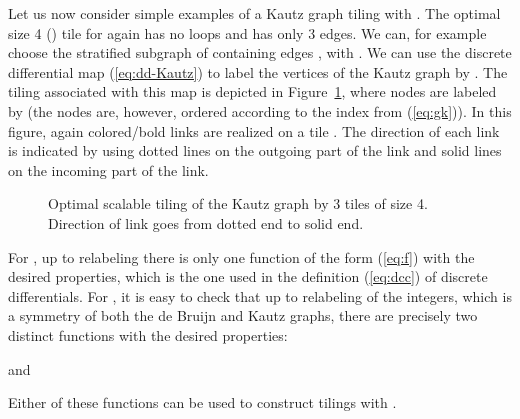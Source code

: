 \documentclass[12pt]{article}
\begin{document}
Let us now consider simple examples of a Kautz graph tiling with .  The optimal size 4 () tile for  again has no loops
and has only 3 edges.  We can, for example choose the stratified
subgraph of  containing edges , with .  We can use the discrete differential map
(\ref{eq:dd-Kautz}) 
to label the vertices of the Kautz graph  by .  The tiling associated with this map is depicted in
Figure~\ref{f:k23-4}, where nodes are labeled by  (the
nodes are, however, ordered according to the index  from
(\ref{eq:gk})).  In this figure, again colored/bold links are realized
on a tile .  The direction of each link is indicated by using
dotted lines on the outgoing part of the link and solid lines on the
incoming part of the link.
\begin{figure}
\begin{center}
\end{center}
\caption[x]{\footnotesize Optimal scalable tiling of the Kautz graph
   by 3 tiles of size 4.  Direction of link goes from
  dotted end to solid end.}
\label{f:k23-4}
\end{figure}

For , up to relabeling there is only one function of the form
(\ref{eq:f}) with the desired properties, which is the one used in the
definition (\ref{eq:dcc}) of discrete differentials.
For ,   it is  easy to check that up to relabeling
of the integers, which is a symmetry of both the de Bruijn and Kautz
graphs, there are precisely two distinct functions with the desired properties:

and

Either of these functions can be used to construct tilings with .
\end{document}
